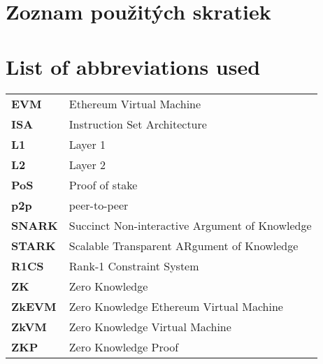 \thispagestyle{plain}

\ifx\FIITlagEN\undefined
    \section*{\Huge Zoznam použitých skratiek}
\else
    \section*{\Huge List of abbreviations used}
\fi
\vskip 1cm

\begin{tabular}{ >{\bfseries}m{2cm} m{10cm} }
	EVM & Ethereum Virtual Machine 							\\
	ISA & Instruction Set Architecture 						\\
	L1 	& Layer 1 											\\
	L2 	& Layer 2 											\\
	PoS & Proof of stake 									\\
	p2p & peer-to-peer 										\\
	SNARK & Succinct Non-interactive Argument of Knowledge 	\\
	STARK & Scalable Transparent ARgument of Knowledge 		\\
	R1CS & Rank-1 Constraint System 						\\
	ZK  & Zero Knowledge           							\\
	ZkEVM  & Zero Knowledge Ethereum Virtual Machine   		\\
	ZkVM  & Zero Knowledge Virtual Machine   				\\
	ZKP & Zero Knowledge Proof
\end{tabular}

\emptypage
